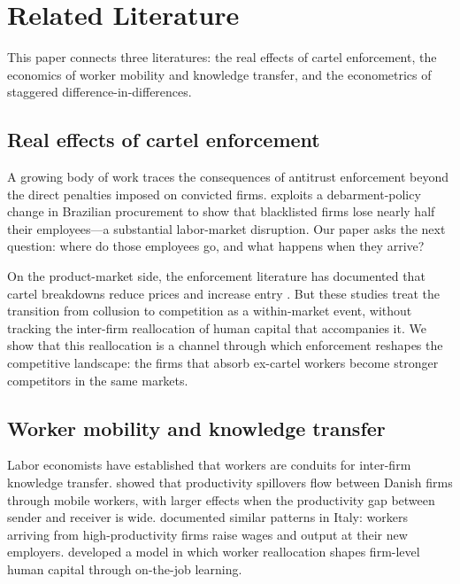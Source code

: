 \section{Related Literature}\label{sec:literature}

This paper connects three literatures: the real effects of cartel enforcement, the economics of worker mobility and knowledge transfer, and the econometrics of staggered difference-in-differences.

\subsection{Real effects of cartel enforcement}

A growing body of work traces the consequences of antitrust enforcement beyond the direct penalties imposed on convicted firms. \citet{szerman2023employee} exploits a debarment-policy change in Brazilian procurement to show that blacklisted firms lose nearly half their employees---a substantial labor-market disruption. Our paper asks the next question: where do those employees go, and what happens when they arrive?

On the product-market side, the enforcement literature has documented that cartel breakdowns reduce prices \citep{connor2005price} and increase entry \citep{harrington2008detecting_effects}. But these studies treat the transition from collusion to competition as a within-market event, without tracking the inter-firm reallocation of human capital that accompanies it. We show that this reallocation is a channel through which enforcement reshapes the competitive landscape: the firms that absorb ex-cartel workers become stronger competitors in the same markets.

\subsection{Worker mobility and knowledge transfer}

Labor economists have established that workers are conduits for inter-firm knowledge transfer. \citet{stoyanov2012worker} showed that productivity spillovers flow between Danish firms through mobile workers, with larger effects when the productivity gap between sender and receiver is wide. \citet{serafinelli2019good} documented similar patterns in Italy: workers arriving from high-productivity firms raise wages and output at their new employers. \citet{jarosch2021learning} developed a model in which worker reallocation shapes firm-level human capital through on-the-job learning.

